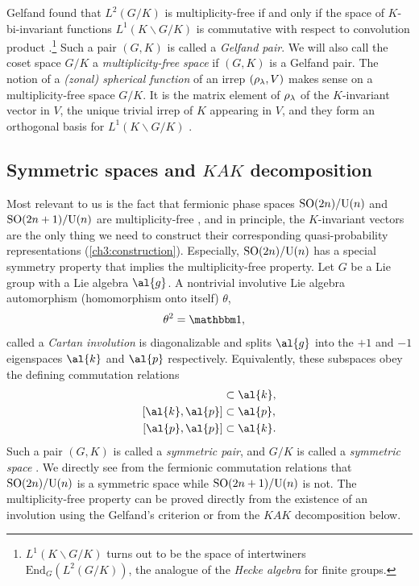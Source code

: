 Gelfand found that $L^2(G/K)$ is multiplicity-free if and only if the space of $K$-bi-invariant functions $L^1(K\backslash G/K)$ is commutative with respect to convolution product \cite{gelfand1950spherical}.\footnote{$L^1(K\backslash G/K)$ turns out to be the space of intertwiners $\text{End}_G(L^2(G/K))$, the analogue of the \emph{Hecke algebra} for finite groups.} Such a pair $(G,K)$ is called a \emph{Gelfand pair}. We will also call the coset space $G/K$ a \emph{multiplicity-free space} if $(G,K)$ is a Gelfand pair.
The notion of a \emph{(zonal) spherical function} of an irrep $(\rho_{\lambda},V)$ makes sense on a multiplicity-free space $G/K$. It is the matrix element of $\rho_{\lambda}$ of the $K$-invariant vector in $V$, the unique trivial irrep of $K$ appearing in $V$, and they form an orthogonal basis for $L^1(K\backslash G/K)$ \cite[\S 17.3]{Vilenkin3}.

\subsection{Symmetric spaces and $KAK$ decomposition}\label{ch2:kak}

Most relevant to us is the fact that fermionic phase spaces $\text{SO}(2n)/\text{U}(n)$ and $\text{SO}(2n+1)/\text{U}(n)$ are multiplicity-free \cite[and references therein]{wolf2007harmonic}, and in principle, the $K$-invariant vectors are the only thing we need to construct their corresponding quasi-probability representations (\autoref{ch3:construction}). Especially, $\text{SO}(2n)/\text{U}(n)$ has a special symmetry property that implies the multiplicity-free property. Let $G$ be a Lie group with a Lie algebra $\al{g}$. A nontrivial involutive Lie algebra automorphism (homomorphism onto itself) $\theta$,
\begin{align}
\theta^2 &= \id,
\end{align}
called a \emph{Cartan involution} is diagonalizable and splits $\al{g}$ into the $+1$ and $-1$ ei\-gen\-spaces $\al{k}$ and $\al{p}$ respectively. Equivalently, these subspaces obey the defining commutation relations 
\begin{align}
[\al{k},\al{k}] &\subset \al{k}, \\
[\al{k},\al{p}] &\subset \al{p}, \label{reductive} \\
[\al{p},\al{p}] &\subset \al{k}. \label{symmetric}
\end{align}
Such a pair $(G,K)$ is called a \emph{symmetric pair}, and $G/K$ is called a \emph{symmetric space} \cite{Helgason}.
We directly see from the fermionic commutation relations that $\text{SO}(2n)/\text{U}(n)$ is a symmetric space while $\text{SO}(2n+1)/\text{U}(n)$ is not. The multiplicity-free property can be proved directly from the existence of an involution using the Gelfand's criterion \cite[pp.36-37]{Gangolli} or from the $KAK$ decomposition below.

